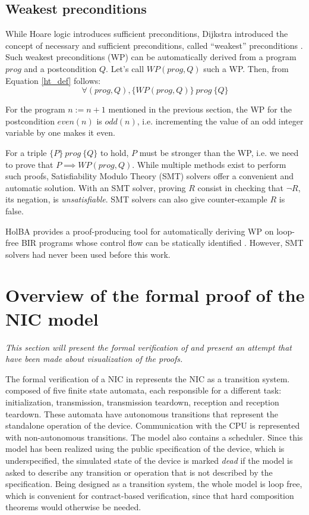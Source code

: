 \documentclass[10pt,a4paper]{article}
\newcommand{\htriple}[3]{\ensuremath{\{#1\}~#2~\{#3\}}}
\newcommand{\WP}{\ensuremath{\mathit{WP}}}
\begin{document}
\begin{multicols}{2}
\subsection{Weakest preconditions}

While Hoare logic introduces sufficient preconditions, Dijkstra introduced the concept of necessary and sufficient preconditions, called ``weakest'' preconditions \cite{dijkstra_guarded_1975}. Such weakest preconditions (WP) can be automatically derived from a program $prog$ and a postcondition $Q$. Let's call $\WP(prog, Q)$ such a WP. Then, from Equation \ref{ht_def} follows:
\begin{equation}
  \forall (prog, Q),
  \htriple{\WP(prog,Q)}{prog}{Q}
  \label{ht_wp_eq}
\end{equation}

For the program $n:=n+1$ mentioned in the previous section, the WP for the postcondition $even(n)$ is $odd(n)$, i.e. incrementing the value of an odd integer variable by one makes it even.

For a triple \htriple{P}{prog}{Q} to hold, $P$ must be stronger than the WP, i.e. we need to prove that $P \implies \WP(prog, Q)$. While multiple methods exist to perform such proofs, Satisfiability Modulo Theory ({SMT}) solvers offer a convenient and automatic solution. With an SMT solver, proving $R$ consist in checking that $\neg R$, its negation, is \textit{unsatisfiable}. SMT solvers can also give counter-example $R$ is false.

{HolBA} provides a {proof-producing} tool for automatically deriving WP on loop-free {BIR} programs whose control flow can be statically identified \cite{lindner_trabin:_2019}. However, SMT solvers had never been used before this work.


\section{Overview of the formal proof of the NIC model} \label{overview-nic-proof}
\textit{This section will present the formal verification of \cite{haglund_formal_2016} and present an attempt that have been made about visualization of the proofs.}
\medskip

The formal verification of a NIC in \cite{haglund_formal_2016} represents the NIC as a transition system. composed of five finite state automata, each responsible for a different task: initialization, transmission, transmission teardown, reception and reception teardown. These automata have autonomous transitions that represent the standalone operation of the device. Communication with the CPU is represented with non-autonomous transitions. The model also contains a scheduler. Since this model has been realized using the public specification of the device, which is underspecified, the simulated state of the device is marked \textit{dead} if the model is asked to describe any transition or operation that is not described by the specification.
Being designed as a transition system, the whole model is loop free, which is convenient for contract-based verification, since that hard composition theorems would otherwise be needed.


\end{multicols}
\end{document}
